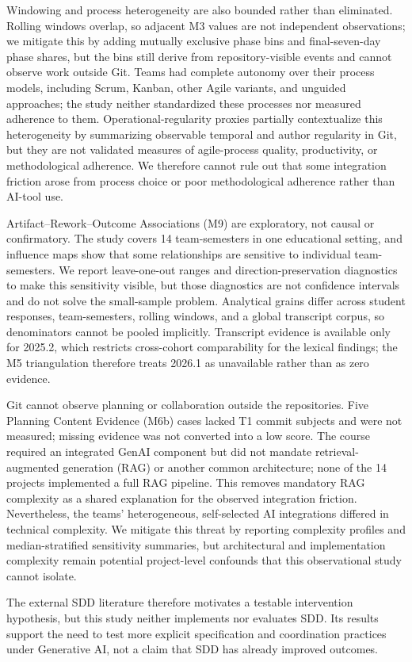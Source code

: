 Windowing and process heterogeneity are also bounded rather than eliminated.
Rolling windows overlap, so adjacent M3 values are not independent
observations; we mitigate this by adding mutually exclusive phase bins and
final-seven-day phase shares, but the bins still derive from repository-visible
events and cannot observe work outside Git. Teams had complete autonomy over
their process models, including Scrum, Kanban, other Agile variants, and
unguided approaches; the study neither standardized these processes nor
measured adherence to them. Operational-regularity proxies partially
contextualize this heterogeneity by summarizing observable temporal and author
regularity in Git, but they are not validated measures of agile-process
quality, productivity, or methodological adherence. We therefore cannot rule
out that some integration friction arose from process choice or poor
methodological adherence rather than AI-tool use.

Artifact--Rework--Outcome Associations (M9) are exploratory, not causal or
confirmatory. The study covers 14 team-semesters in one educational setting,
and influence maps show that some relationships are sensitive to individual
team-semesters. We report leave-one-out ranges and direction-preservation
diagnostics to make this sensitivity visible, but those diagnostics are not
confidence intervals and do not solve the small-sample problem. Analytical
grains differ across student responses, team-semesters, rolling windows, and a
global transcript corpus, so denominators cannot be pooled implicitly.
Transcript evidence is available only for 2025.2, which restricts cross-cohort
comparability for the lexical findings; the M5 triangulation therefore treats
2026.1 as unavailable rather than as zero evidence.

Git cannot observe planning or collaboration outside the repositories. Five
Planning Content Evidence (M6b) cases lacked T1 commit subjects and were not
measured; missing evidence was not converted into a low score. The course
required an integrated GenAI component but did not mandate retrieval-augmented
generation (RAG) or another common architecture; none of the 14 projects
implemented a full RAG pipeline. This removes mandatory RAG complexity as a
shared explanation for the observed integration friction. Nevertheless, the
teams' heterogeneous, self-selected AI integrations differed in technical
complexity. We mitigate this threat by reporting complexity profiles and
median-stratified sensitivity summaries, but architectural and implementation
complexity remain potential project-level confounds that this observational
study cannot isolate.

The external SDD literature therefore motivates a testable intervention
hypothesis, but this study neither implements nor evaluates SDD. Its results
support the need to test more explicit specification and coordination practices
under Generative AI, not a claim that SDD has already improved outcomes.
